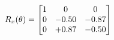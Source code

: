 \documentclass[preview]{standalone}
\begin{document}
\begin{align*}
\special{dvisvgm:raw <g id='unique000'>}R_{x}(\theta) = \begin{bmatrix}1 & 0 & 0 \\0 & -0.50 & -0.87 \\0 & +0.87 & -0.50\end{bmatrix}\special{dvisvgm:raw </g>}
\end{align*}
\end{document}
